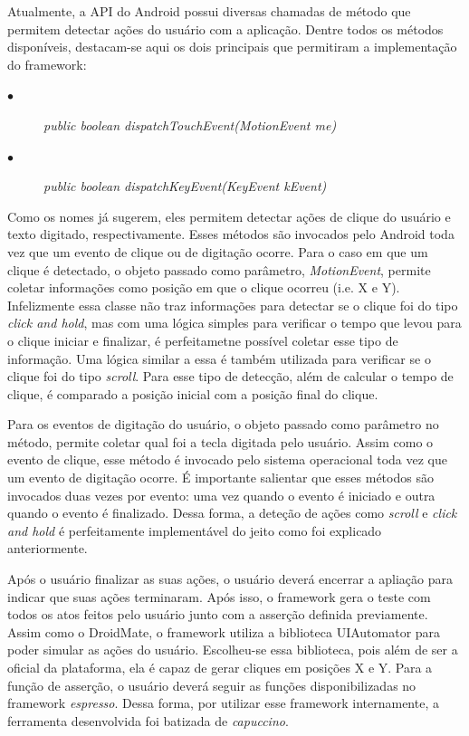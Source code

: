 \documentclass[
    12pt,       %
    openright,      %
    twoside,      %
    a4paper,      %
    english,      %
    french,       %
    spanish,      %
    brazil,       %
    ]{abntex2}
\begin{document}
        Atualmente, a API do Android possui diversas chamadas de método que permitem detectar
        ações do usuário com a aplicação. Dentre todos os métodos disponíveis, destacam-se aqui
        os dois principais que permitiram a implementação do framework: \par
        \begin{description}
          \item[$\bullet$] \textit{public boolean dispatchTouchEvent(MotionEvent me)}
          \item[$\bullet$] \textit{public boolean dispatchKeyEvent(KeyEvent kEvent)}
        \end{description}

        Como os nomes já sugerem, eles permitem detectar ações de clique do usuário
        e texto digitado, respectivamente. Esses métodos são invocados pelo Android toda
        vez que um evento de clique ou de digitação ocorre. Para o caso em que um clique
        é detectado, o objeto passado como parâmetro, \textit{MotionEvent}, permite coletar
        informações como posição em que o clique ocorreu (i.e. X e Y). Infelizmente essa classe
        não traz informações para detectar se o clique foi do tipo \textit{click and hold}, mas
        com uma lógica simples para verificar o tempo que levou para o clique iniciar e
        finalizar, é perfeitametne possível coletar esse tipo de informação. Uma lógica similar
        a essa é também utilizada para verificar se o clique foi do tipo \textit{scroll}. Para
        esse tipo de detecção, além de calcular o tempo de clique, é comparado a posição inicial
        com a posição final do clique.

        Para os eventos de digitação do usuário, o objeto passado como parâmetro no método, permite
        coletar qual foi a tecla digitada pelo usuário. Assim como o evento de clique, esse método é
        invocado pelo sistema operacional toda vez que um evento de digitação ocorre. É importante
        salientar que esses métodos são invocados duas vezes por evento: uma vez quando o evento é
        iniciado e outra quando o evento é finalizado. Dessa forma, a deteção de ações como
        \textit{scroll} e \textit{click and hold} é perfeitamente implementável do jeito como foi
        explicado anteriormente.

        Após o usuário finalizar as suas ações, o usuário deverá encerrar a apliação para indicar
        que suas ações terminaram. Após isso, o framework gera o teste com todos os atos feitos pelo usuário
        junto com a asserção definida previamente. Assim como o DroidMate, o framework utiliza
        a biblioteca UIAutomator para poder simular as ações do usuário. Escolheu-se essa biblioteca,
        pois além de ser a oficial da plataforma, ela é capaz de gerar cliques em posições X e Y.
        Para a função de asserção, o usuário deverá seguir as funções disponibilizadas no framework
        \textit{espresso}. Dessa forma, por utilizar esse framework internamente, a ferramenta
        desenvolvida foi batizada de \textit{capuccino}.
\end{document}
